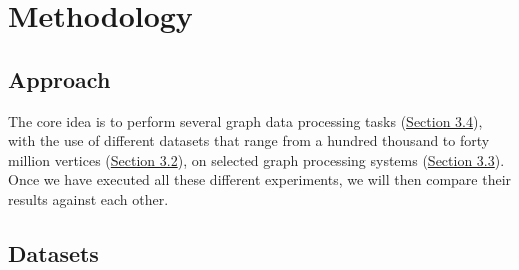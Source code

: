 \documentclass[a4paper,11pt]{article}
\begin{document}








\section{Methodology} \label{methodology}

\subsection{Approach} \label{approach}

\par The core idea is to perform several graph data processing tasks (\hyperref[algos]{Section 3.4}), with the use of different datasets that range from a hundred thousand to forty million vertices (\hyperref[datasets]{Section 3.2}), on selected graph processing systems (\hyperref[graph-proc]{Section 3.3}). Once we have executed all these different experiments, we will then compare their results against each other.

\subsection{Datasets} \label{datasets}
\end{document}
